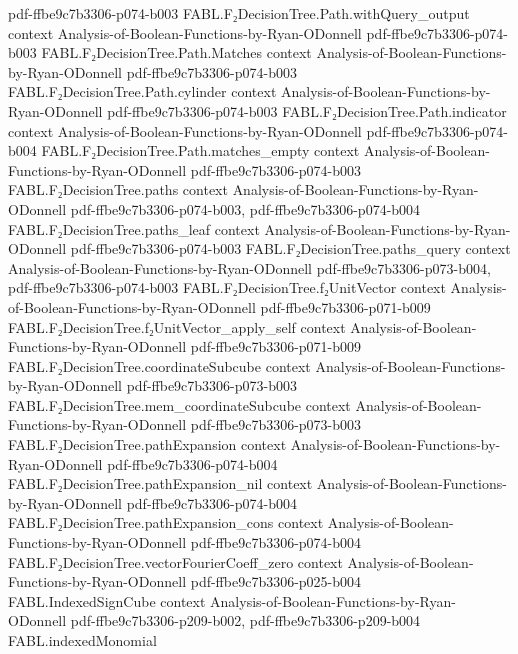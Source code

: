 \begin{theorem}
  {pdf-ffbe9c7b3306-p074-b003}
\proofstep
  {FABL.F₂DecisionTree.Path.withQuery_output}
  {context}
  {Analysis-of-Boolean-Functions-by-Ryan-ODonnell}
  {pdf-ffbe9c7b3306-p074-b003}
\proofstep
  {FABL.F₂DecisionTree.Path.Matches}
  {context}
  {Analysis-of-Boolean-Functions-by-Ryan-ODonnell}
  {pdf-ffbe9c7b3306-p074-b003}
\proofstep
  {FABL.F₂DecisionTree.Path.cylinder}
  {context}
  {Analysis-of-Boolean-Functions-by-Ryan-ODonnell}
  {pdf-ffbe9c7b3306-p074-b003}
\proofstep
  {FABL.F₂DecisionTree.Path.indicator}
  {context}
  {Analysis-of-Boolean-Functions-by-Ryan-ODonnell}
  {pdf-ffbe9c7b3306-p074-b004}
\proofstep
  {FABL.F₂DecisionTree.Path.matches_empty}
  {context}
  {Analysis-of-Boolean-Functions-by-Ryan-ODonnell}
  {pdf-ffbe9c7b3306-p074-b003}
\proofstep
  {FABL.F₂DecisionTree.paths}
  {context}
  {Analysis-of-Boolean-Functions-by-Ryan-ODonnell}
  {pdf-ffbe9c7b3306-p074-b003,
    pdf-ffbe9c7b3306-p074-b004}
\proofstep
  {FABL.F₂DecisionTree.paths_leaf}
  {context}
  {Analysis-of-Boolean-Functions-by-Ryan-ODonnell}
  {pdf-ffbe9c7b3306-p074-b003}
\proofstep
  {FABL.F₂DecisionTree.paths_query}
  {context}
  {Analysis-of-Boolean-Functions-by-Ryan-ODonnell}
  {pdf-ffbe9c7b3306-p073-b004,
    pdf-ffbe9c7b3306-p074-b003}
\proofstep
  {FABL.F₂DecisionTree.f₂UnitVector}
  {context}
  {Analysis-of-Boolean-Functions-by-Ryan-ODonnell}
  {pdf-ffbe9c7b3306-p071-b009}
\proofstep
  {FABL.F₂DecisionTree.f₂UnitVector_apply_self}
  {context}
  {Analysis-of-Boolean-Functions-by-Ryan-ODonnell}
  {pdf-ffbe9c7b3306-p071-b009}
\proofstep
  {FABL.F₂DecisionTree.coordinateSubcube}
  {context}
  {Analysis-of-Boolean-Functions-by-Ryan-ODonnell}
  {pdf-ffbe9c7b3306-p073-b003}
\proofstep
  {FABL.F₂DecisionTree.mem_coordinateSubcube}
  {context}
  {Analysis-of-Boolean-Functions-by-Ryan-ODonnell}
  {pdf-ffbe9c7b3306-p073-b003}
\proofstep
  {FABL.F₂DecisionTree.pathExpansion}
  {context}
  {Analysis-of-Boolean-Functions-by-Ryan-ODonnell}
  {pdf-ffbe9c7b3306-p074-b004}
\proofstep
  {FABL.F₂DecisionTree.pathExpansion_nil}
  {context}
  {Analysis-of-Boolean-Functions-by-Ryan-ODonnell}
  {pdf-ffbe9c7b3306-p074-b004}
\proofstep
  {FABL.F₂DecisionTree.pathExpansion_cons}
  {context}
  {Analysis-of-Boolean-Functions-by-Ryan-ODonnell}
  {pdf-ffbe9c7b3306-p074-b004}
\proofstep
  {FABL.F₂DecisionTree.vectorFourierCoeff_zero}
  {context}
  {Analysis-of-Boolean-Functions-by-Ryan-ODonnell}
  {pdf-ffbe9c7b3306-p025-b004}
\proofstep
  {FABL.IndexedSignCube}
  {context}
  {Analysis-of-Boolean-Functions-by-Ryan-ODonnell}
  {pdf-ffbe9c7b3306-p209-b002,
    pdf-ffbe9c7b3306-p209-b004}
\proofstep
  {FABL.indexedMonomial}

\end{theorem}
